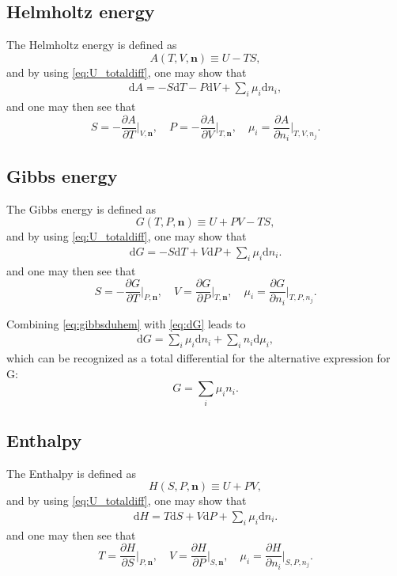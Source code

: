 \documentclass[internal,english]{sintefmemo2012}
\newcommand{\pone}[3]{\frac{\partial #1}{\partial #2}\bigg|_{#3}}%
\newcommand*{\vektor}[1]{\boldsymbol{#1}}%
\newcommand{\dd}[1]{\mathrm{d}{#1}}
\begin{document}
\subsection{Helmholtz energy}
The Helmholtz energy is defined as
\begin{equation}
  A(T,V,\vektor{n}) \equiv U - TS,
  \label{eq:helmholtz_def}
\end{equation}
and by using \eqref{eq:U_totaldiff}, one may show that
\begin{align}
  \dd{A} = -S\dd{T} - P\dd{V} + \sum_i \mu_i \dd{n_i},
  \label{}
\end{align}
and one may then see that
\begin{equation}
  S = -\pone{A}{T}{V,\vektor{n}}, \quad P = -\pone{A}{V}{T,\vektor{n}}, \quad \mu_i = \pone{A}{n_i}{T,V,n_j}.
  \label{eq:A_differentials}
\end{equation}


\subsection{Gibbs energy}
The Gibbs energy is defined as 
\begin{equation}
  G(T,P,\vektor{n}) \equiv U + PV - TS,
  \label{eq:gibbs_def}
\end{equation}
and by using \eqref{eq:U_totaldiff}, one may show that
\begin{align}
  \dd{G} = -S\dd{T} + V\dd{P} + \sum_i \mu_i \dd{n_i}.
  \label{eq:dG}
\end{align}
and one may then see that
\begin{equation}
  S = -\pone{G}{T}{P,\vektor{n}}, \quad V = \pone{G}{P}{T,\vektor{n}}, \quad \mu_i = \pone{G}{n_i}{T,P,n_j}.
  \label{}
\end{equation}

Combining \eqref{eq:gibbsduhem} with \eqref{eq:dG} leads to  
\begin{align}
  \dd{G} = \sum_i \mu_i \dd{n_i} + \sum_i n_i \dd{\mu_i},
  \label{}
\end{align}
which can be recognized as a total differential for the alternative expression for G:
\begin{equation}
  G = \sum_i \mu_i n_i.
  \label{eq:G_alt}
\end{equation}


\subsection{Enthalpy}
The Enthalpy is defined as 
\begin{equation}
  H(S,P,\vektor{n}) \equiv U + PV,
  \label{}
\end{equation}
and by using \eqref{eq:U_totaldiff}, one may show that
\begin{align}
  \dd{H} = T\dd{S} + V\dd{P} + \sum_i \mu_i \dd{n_i}.
  \label{eq:dH}
\end{align}
and one may then see that
\begin{equation}
  T = \pone{H}{S}{P,\vektor{n}}, \quad V = \pone{H}{P}{S,\vektor{n}}, \quad \mu_i = \pone{H}{n_i}{S,P,n_j}.
  \label{}
\end{equation}
\end{document}
